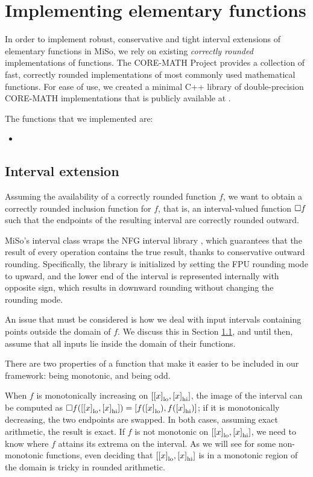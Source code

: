 \section{Implementing elementary functions}
In order to implement robust, conservative and tight interval extensions of elementary functions in MiSo, we rely on existing \emph{correctly rounded} implementations of functions.
The CORE-MATH Project \cite{} provides a collection of fast, correctly rounded implementations of most commonly used mathematical functions.
For ease of use, we created a minimal C++ library of double-precision CORE-MATH implementations that is publicly available at \url{}.

The functions that we implemented are:
\begin{itemize}
	\item
\end{itemize}

\subsection{Interval extension}
Assuming the availability of a correctly rounded function $f$, we want to obtain a correctly rounded inclusion function for $f$, that is, an interval-valued function $\Box f$ such that the endpoints of the resulting interval are correctly rounded outward.

MiSo's interval class wraps the NFG interval library \cite{}, which guarantees that the result of every operation contains the true result, thanks to conservative outward rounding. Specifically, the library is initialized by setting the FPU rounding mode to upward, and the lower end of the interval is represented internally with opposite sign, which results in downward rounding without changing the rounding mode.

An issue that must be considered is how we deal with input intervals containing points outside the domain of $f$. We discuss this in Section \ref{}, and until then, assume that all inputs lie inside the domain of their functions.

There are two properties of a function that make it easier to be included in our framework: being monotonic, and being odd.

When $f$ is monotonically increasing on $[{[x]}_{\textrm{lo}}, {[x]}_{\textrm{hi}}]$, the image of the interval can be computed as $\Box f([{[x]}_{\textrm{lo}}, {[x]}_{\textrm{hi}}]) = [f({[x]}_{\textrm{lo}}), f({[x]}_{\textrm{hi}})]$; if it is monotonically decreasing, the two endpoints are swapped. In both cases, assuming exact arithmetic, the result is exact.
If $f$ is not monotonic on $[{[x]}_{\textrm{lo}}, {[x]}_{\textrm{hi}}]$, we need to know where $f$ attains its extrema on the interval. As we will see for some non-monotonic functions, even deciding that $[{[x]}_{\textrm{lo}}, {[x]}_{\textrm{hi}}]$ is in a monotonic region of the domain is tricky in rounded arithmetic.

